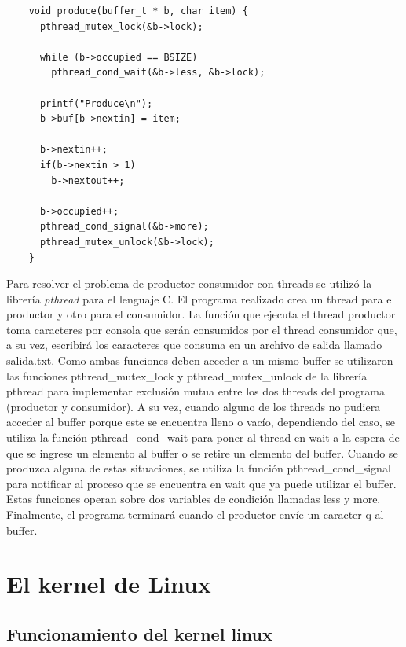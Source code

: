 \documentclass[a4paper,11pt] {article}
\begin{document}
\begin{enumerate}
\begin{verbatim}
	void produce(buffer_t * b, char item) {
	  pthread_mutex_lock(&b->lock);
	
	  while (b->occupied == BSIZE)
	    pthread_cond_wait(&b->less, &b->lock);

	  printf("Produce\n");
	  b->buf[b->nextin] = item;
	
	  b->nextin++;
	  if(b->nextin > 1)
	    b->nextout++;

	  b->occupied++;
	  pthread_cond_signal(&b->more);
	  pthread_mutex_unlock(&b->lock);
	}
	\end{verbatim}

	Para resolver el problema de productor-consumidor con threads se utilizó la librería \textit{pthread} para el lenguaje C.
	El programa realizado crea un thread para el productor y otro para el consumidor. La función que ejecuta el thread productor toma caracteres por consola que serán consumidos por el thread consumidor que, a su vez, escribirá los caracteres que consuma en un archivo de salida llamado salida.txt. Como ambas funciones deben acceder a un mismo buffer se utilizaron las funciones pthread\_mutex\_lock y pthread\_mutex\_unlock de la librería pthread para implementar exclusión mutua entre los dos threads del programa (productor y consumidor). A su vez, cuando alguno de los threads no pudiera acceder al buffer porque este se encuentra lleno o vacío, dependiendo del caso, se utiliza la función pthread\_cond\_wait para poner al thread en wait a la espera de que se ingrese un elemento al buffer o se retire un elemento del buffer. Cuando se produzca alguna de estas situaciones, se utiliza la función pthread\_cond\_signal para notificar al proceso que se encuentra en wait que ya puede utilizar el buffer. Estas funciones operan sobre dos variables de condición llamadas less y more. Finalmente, el programa terminará cuando el productor envíe un caracter q al buffer.

\end{enumerate}

\section*{El kernel de Linux}

\subsection*{Funcionamiento del kernel linux}
\end{document}
